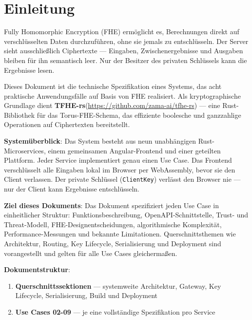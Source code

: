 \section{Einleitung}
\label{sec:einleitung}

Fully Homomorphic Encryption (FHE) ermöglicht es, Berechnungen direkt auf verschlüsselten Daten durchzuführen, ohne sie jemals zu entschlüsseln. Der Server sieht ausschließlich Ciphertexte — Eingaben, Zwischenergebnisse und Ausgaben bleiben für ihn semantisch leer. Nur der Besitzer des privaten Schlüssels kann die Ergebnisse lesen.

Dieses Dokument ist die technische Spezifikation eines Systems, das acht praktische Anwendungsfälle auf Basis von FHE realisiert. Als kryptographische Grundlage dient \textbf{TFHE-rs}(\url{https://github.com/zama-ai/tfhe-rs}) — eine Rust-Bibliothek für das Torus-FHE-Schema, das effiziente boolesche und ganzzahlige Operationen auf Ciphertexten bereitstellt.

\textbf{Systemüberblick}:
Das System besteht aus neun unabhängigen Rust-Microservices, einem gemeinsamen Angular-Frontend und einer geteilten Plattform. Jeder Service implementiert genau einen Use Case. Das Frontend verschlüsselt alle Eingaben lokal im Browser per WebAssembly, bevor sie den Client verlassen. Der private Schlüssel (\verb|ClientKey|) verlässt den Browser nie — nur der Client kann Ergebnisse entschlüsseln.

\textbf{Ziel dieses Dokuments}:
Das Dokument spezifiziert jeden Use Case in einheitlicher Struktur: Funktionsbeschreibung, OpenAPI-Schnittstelle, Trust- und Threat-Modell, FHE-Designentscheidungen, algorithmische Komplexität, Performance-Messungen und bekannte Limitationen. Querschnittsthemen wie Architektur, Routing, Key Lifecycle, Serialisierung und Deployment sind vorangestellt und gelten für alle Use Cases gleichermaßen.

\textbf{Dokumentstruktur}:
\begin{enumerate}
    \item \textbf{Querschnittssektionen} — systemweite Architektur, Gateway, Key Lifecycle, Serialisierung, Build und Deployment
    \item \textbf{Use Cases 02-09} — je eine vollständige Spezifikation pro Service
\end{enumerate}